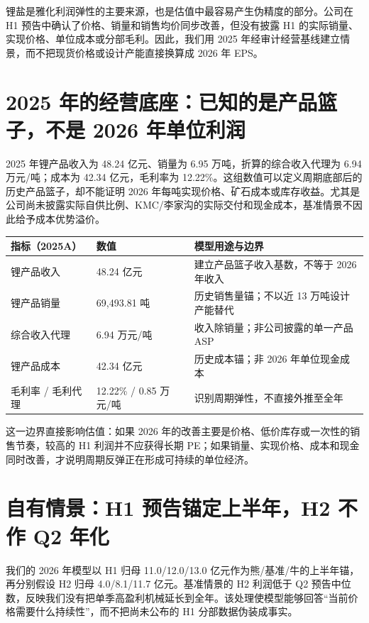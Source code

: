 锂盐是雅化利润弹性的主要来源，也是估值中最容易产生伪精度的部分。公司在 H1 预告中确认了价格、销量和销售均价同步改善，但没有披露 H1 的实际销量、实现价格、单位成本或分部毛利。因此，我们用 2025 年经审计经营基线建立情景，而不把现货价格或设计产能直接换算成 2026 年 EPS。

\section{2025 年的经营底座：已知的是产品篮子，不是 2026 年单位利润}

2025 年锂产品收入为 48.24 亿元、销量为 6.95 万吨，折算的综合收入代理为 6.94 万元/吨；成本为 42.34 亿元，毛利率为 12.22\%。这组数值可以定义周期底部后的历史产品篮子，却不能证明 2026 年每吨实现价格、矿石成本或库存收益。尤其是公司尚未披露实际自供比例、KMC/李家沟的实际交付和现金成本，基准情景不因此给予成本优势溢价。

\begin{exhibitbox}
\begin{tabularx}{\exhibitboxwidth}{L{4.2cm}R{2.8cm}X}
\toprule
指标（2025A） & 数值 & 模型用途与边界 \\
\midrule
锂产品收入 & 48.24 亿元 & 建立产品篮子收入基数，不等于 2026 年收入 \\
锂产品销量 & 69,493.81 吨 & 历史销售量锚；不以近 13 万吨设计产能替代 \\
综合收入代理 & 6.94 万元/吨 & 收入除销量；非公司披露的单一产品 ASP \\
锂产品成本 & 42.34 亿元 & 历史成本锚；非 2026 年单位现金成本 \\
毛利率 / 毛利代理 & 12.22\% / 0.85 万元/吨 & 识别周期弹性，不直接外推至全年 \\
\bottomrule
\end{tabularx}
\end{exhibitbox}

这一边界直接影响估值：如果 2026 年的改善主要是价格、低价库存或一次性的销售节奏，较高的 H1 利润并不应获得长期 PE；如果销量、实现价格、成本和现金同时改善，才说明周期反弹正在形成可持续的单位经济。

\section{自有情景：H1 预告锚定上半年，H2 不作 Q2 年化}

我们的 2026 年模型以 H1 归母 11.0/12.0/13.0 亿元作为熊/基准/牛的上半年锚，再分别假设 H2 归母 4.0/8.1/11.7 亿元。基准情景的 H2 利润低于 Q2 预告中位数，反映我们没有把单季高盈利机械延长到全年。该处理使模型能够回答“当前价格需要什么持续性”，而不把尚未公布的 H1 分部数据伪装成事实。

